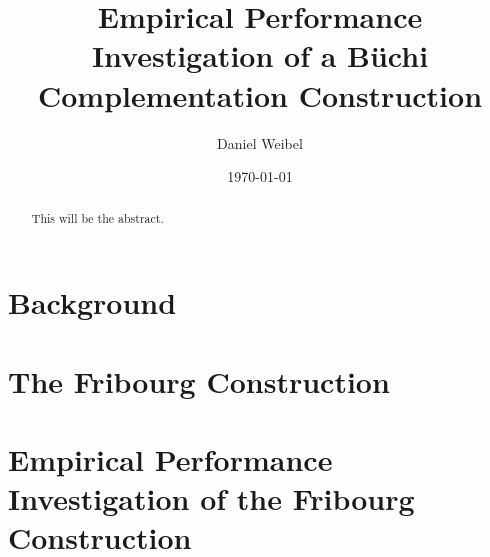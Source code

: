 \documentclass[a4paper]{report}
\title{Empirical Performance Investigation of a Büchi\\Complementation Construction}
\author{Daniel Weibel}
\date{\today}
\begin{document}
\maketitle


\begin{abstract}
This will be the abstract.
\end{abstract}

\renewcommand{\abstractname}{Acknowledgements}
\begin{abstract}
\end{abstract}

\dominitoc
\tableofcontents

% 

\chapter{Background}
\label{chap_background}
\minitoc
\newpage


\chapter{The Fribourg Construction}
\label{chap_construction}
\minitoc
\newpage


\chapter{Empirical Performance Investigation of the Fribourg Construction}
\label{chap_investigation}
\minitoc
\vspace{1cm}

\end{document}
